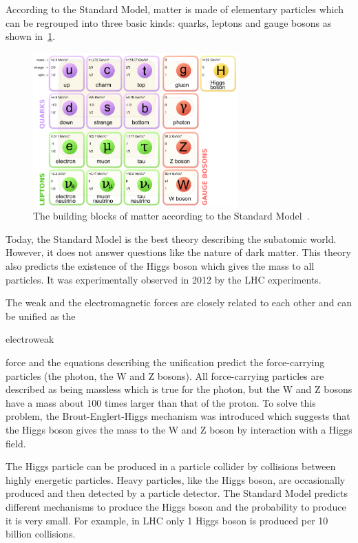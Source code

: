 According to the Standard Model, matter is made of elementary
particles which can be regrouped into three basic kinds: quarks,
leptons and gauge bosons as shown in~\cref{fig:standardmodel}.

\begin{figure}[htbp]
  \centering
  \includegraphics[width=0.7\textwidth]{figures/CLIC/StandardModel.png}
  \caption{The building blocks of matter according to the Standard
    Model~\cite{wikipediaParticles}.}
  \label{fig:standardmodel}
\end{figure}

Today, the Standard Model is the best theory describing the subatomic
world. However, it does not answer questions like the nature of dark
matter. This theory also predicts the existence of the Higgs boson
which gives the mass to all particles. It was experimentally observed
in 2012 by the LHC experiments.

The weak and the electromagnetic forces are closely related to each
other and can be unified as the \begin{it}electroweak\end{it} force
and the equations describing the unification predict the
force-carrying particles (the photon, the W and Z bosons). All
force-carrying particles are described as being massless which is true
for the photon, but the W and Z bosons have a mass about 100 times
larger than that of the proton. To solve this problem, the
Brout-Englert-Higgs mechanism was introduced which suggests that the
Higgs boson gives the mass to the W and Z boson by interaction with a
Higgs field.

The Higgs particle can be produced in a particle collider by
collisions between highly energetic particles. Heavy particles, like
the Higgs boson, are occasionally produced and then detected by a
particle detector. The Standard Model predicts different mechanisms to
produce the Higgs boson and the probability to produce it is very
small. For example, in LHC only 1 Higgs boson is produced per 10
billion collisions.

